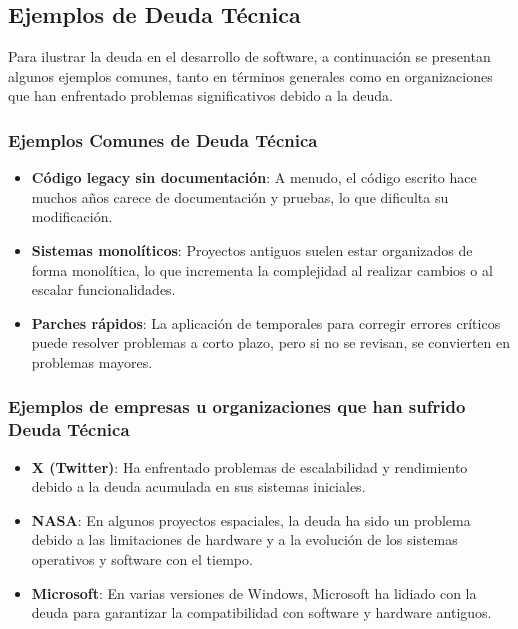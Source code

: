 \subsection{Ejemplos de Deuda Técnica}

Para ilustrar la \gls{deuda} en el desarrollo de software, a continuación se presentan algunos ejemplos comunes, tanto en términos generales como en organizaciones que han enfrentado problemas significativos debido a la \gls{deuda}.

\subsubsection{Ejemplos Comunes de Deuda Técnica}

\begin{itemize}
    \item \textbf{Código legacy sin documentación}: A menudo, el código escrito hace muchos años carece de documentación y pruebas, lo que dificulta su modificación.
    \item \textbf{Sistemas monolíticos}: Proyectos antiguos suelen estar organizados de forma monolítica, lo que incrementa la complejidad al realizar cambios o al escalar funcionalidades.
    \item \textbf{Parches rápidos}: La aplicación de  temporales para corregir errores críticos puede resolver problemas a corto plazo, pero si no se revisan, se convierten en problemas mayores.
\end{itemize}

\subsubsection{Ejemplos de empresas u organizaciones que han sufrido Deuda Técnica}

\begin{itemize}
    \item \textbf{X (Twitter)}: Ha enfrentado problemas de escalabilidad y rendimiento debido a la \gls{deuda} acumulada en sus sistemas iniciales.
    \item \textbf{NASA}: En algunos proyectos espaciales, la \gls{deuda} ha sido un problema debido a las limitaciones de hardware y a la evolución de los sistemas operativos y software con el tiempo. \item \textbf{Microsoft}: En varias versiones de Windows, Microsoft ha lidiado con la \gls{deuda} para garantizar la compatibilidad con software y hardware antiguos.
\end{itemize}

